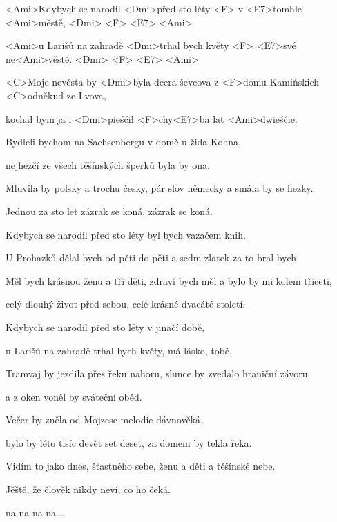 

\zs
<Ami>Kdybych se narodil <Dmi>před sto léty
<F> v <E7>tomhle <Ami>městě, <Dmi> <F> <E7> <Ami>

<Ami>u Larišů na zahradě <Dmi>trhal bych květy <F>
<E7>své ne<Ami>věstě. <Dmi> <F> <E7> <Ami>

<C>Moje nevěsta by <Dmi>byla dcera ševcova
z <F>domu Kamińskich <C>odněkud ze Lvova,

kochał bym ja i <Dmi>pieśćił <F>chy<E7>ba lat <Ami>dwieśćie.
\ks

\zs
Bydleli bychom na Sachsenbergu v domě u žida Kohna,

nejhezčí ze všech těšínských šperků byla by ona.

Mluvila by polsky a trochu česky,
pár slov německy a smála by se hezky.

Jednou za sto let zázrak se koná, zázrak se koná.
\ks

\zs
Kdybych se narodil před sto léty byl bych vazačem knih.

U Prohazků dělal bych od pěti do pěti a sedm zlatek za to bral bych.

Měl bych krásnou ženu a tři děti,
zdraví bych měl a bylo by mi kolem třiceti,

celý dlouhý život před sebou, celé krásné dvacáté století.
\ks

\zs
Kdybych se narodil před sto léty v jinačí době,

u Larišů na zahradě trhal bych květy, má lásko, tobě.

Tramvaj by jezdila přes řeku nahoru,
slunce by zvedalo hraniční závoru

a z oken voněl by sváteční oběd.
\ks

\zs
Večer by zněla od Mojzese melodie dávnověká,

bylo by léto tisíc devět set deset, za domem by tekla řeka.

Vidím to jako dnes, šťastného sebe,
ženu a děti a těšínské nebe.

Jěště, že člověk nikdy neví, co ho čeká.

na na na na...
\ks

\kp
